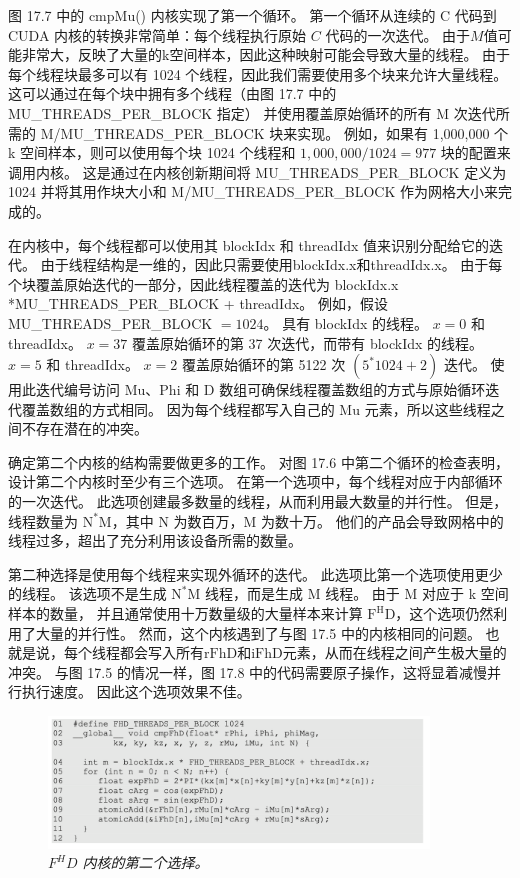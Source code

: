 图 17.7 中的 cmpMu() 内核实现了第一个循环。 
第一个循环从连续的 $\mathrm{C}$ 代码到 CUDA 内核的转换非常简单：每个线程执行原始 $C$ 代码的一次迭代。 
由于$M$值可能非常大，反映了大量的k空间样本，因此这种映射可能会导致大量的线程。 
由于每个线程块最多可以有 1024 个线程，因此我们需要使用多个块来允许大量线程。 
这可以通过在每个块中拥有多个线程（由图 17.7 中的 MU\_THREADS\_PER\_BLOCK 指定）
并使用覆盖原始循环的所有 M 次迭代所需的 M/MU\_THREADS\_PER\_BLOCK 块来实现。
例如，如果有 1,000,000 个 k 空间样本，则可以使用每个块 1024 个线程和 $1,000,000 / 1024=977$ 块的配置来调用内核。 
这是通过在内核创新期间将 MU\_THREADS\_PER\_BLOCK 定义为 1024 
并将其用作块大小和 M/MU\_THREADS\_PER\_BLOCK 作为网格大小来完成的。

在内核中，每个线程都可以使用其 blockIdx 和 threadIdx 值来识别分配给它的迭代。 
由于线程结构是一维的，因此只需要使用blockIdx.x和threadIdx.x。 
由于每个块覆盖原始迭代的一部分，因此线程覆盖的迭代为 blockIdx.x *MU\_THREADS\_PER\_BLOCK + threadIdx。 
例如，假设 MU\_THREADS\_PER\_BLOCK $=1024$。 具有 blockIdx 的线程。 $x=0$ 和 threadIdx。 
$x=37$ 覆盖原始循环的第 37 次迭代，而带有 blockIdx 的线程。 $x=5$ 和 threadIdx。 
$x=2$ 覆盖原始循环的第 5122 次 $\left(5^{*} 1024+2\right)$ 迭代。 
使用此迭代编号访问 $\mathrm{Mu}$、Phi 和 D 数组可确保线程覆盖数组的方式与原始循环迭代覆盖数组的方式相同。 
因为每个线程都写入自己的 $\mathrm{Mu}$ 元素，所以这些线程之间不存在潜在的冲突。

确定第二个内核的结构需要做更多的工作。 对图 17.6 中第二个循环的检查表明，设计第二个内核时至少有三个选项。 
在第一个选项中，每个线程对应于内部循环的一次迭代。 此选项创建最多数量的线程，从而利用最大数量的并行性。 
但是，线程数量为 $\mathrm{N}^{*} \mathrm{M}$，其中 $\mathrm{N}$ 为数百万，$\mathrm{M}$ 为数十万。 
他们的产品会导致网格中的线程过多，超出了充分利用该设备所需的数量。

第二种选择是使用每个线程来实现外循环的迭代。 此选项比第一个选项使用更少的线程。 
该选项不是生成 $\mathrm{N}^{*} \mathrm{M}$ 线程，而是生成 $\mathrm{M}$ 线程。 
由于 $\mathrm{M}$ 对应于 k 空间样本的数量，
并且通常使用十万数量级的大量样本来计算 $\mathrm{F}^{\mathrm{H} } \mathrm{D}$，这个选项仍然利用了大量的并行性。 
然而，这个内核遇到了与图 17.5 中的内核相同的问题。 
也就是说，每个线程都会写入所有$\mathrm{rFhD}$和$\mathrm{iFhD}$元素，从而在线程之间产生极大量的冲突。 
与图 17.5 的情况一样，图 17.8 中的代码需要原子操作，这将显着减慢并行执行速度。 因此这个选项效果不佳。

\begin{figure}[H]
	\centering
	\includegraphics[width=0.9\textwidth]{figs/F17.8.png}
	\caption{\textit{$F^H D$ 内核的第二个选择。}}
\end{figure}

